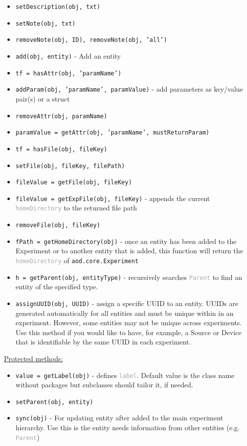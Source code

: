 \documentclass[10pt]{exam}
\newcommand\aodclass[1]{\textcolor{codeblue}{\texttt{#1}}}
\newcommand\aodprop[1]{\textcolor{darkgray}{\texttt{#1}}}
\newcommand\aodfcn[1]{\textcolor{darkteal}{\texttt{#1}}}
\newcommand\docheader[1]{\vspace{0.6ex}\noindent\underline{#1}\vspace{0.15ex}}
\begin{document}
		\begin{itemize}
			\item \aodfcn{setDescription(obj, txt)}
			\item \aodfcn{setNote(obj, txt)}
			\item \aodfcn{removeNote(obj, ID), \aodfcn{removeNote(obj, 'all')}}\\
			\item \aodfcn{add(obj, entity)} - Add an entity\\
			\item \aodfcn{tf = hasAttr(obj, 'paramName')}
			\item \aodfcn{addParam(obj, 'paramName', paramValue)} - add parameters as key/value pair(s) or a struct
			\item \aodfcn{removeAttr(obj, paramName)}
			\item \aodfcn{paramValue = getAttr(obj, 'paramName', mustReturnParam)}\\
			\item \aodfcn{tf = hasFile(obj, fileKey)}
			\item \aodfcn{setFile(obj, fileKey, filePath)}
			\item \aodfcn{fileValue = getFile(obj, fileKey)}
			\item \aodfcn{fileValue = getExpFile(obj, fileKey)} - appends the current \aodprop{homeDirectory} to the returned file path
			\item \aodfcn{removeFile(obj, fileKey)}\\
			\item \aodfcn{fPath = getHomeDirectory(obj)} - once an entity has been added to the Experiment or to another entity that is added, this function will return the \aodprop{homeDirectory} of \aodclass{aod.core.Experiment}
			\item \aodfcn{h = getParent(obj, entityType)} - recursively searches \aodprop{Parent} to find an entity of the specified type. %
			\item \aodfcn{assignUUID(obj, UUID)} - assign a specific UUID to an entity. UUIDs are generated automatically for all entities and must be unique within in an experiment. However, some entities may not be unique across experiments. Use this method if you would like to have, for example, a Source or Device that is identifiable by the same UUID in each experiment. 
		\end{itemize}
		\docheader{Protected methods:}
		\begin{itemize}
			\item \aodfcn{value = getLabel(obj)} - defines \aodprop{label}. Default value is the class name without packages but subclasses should tailor it, if needed.
			\item \aodfcn{setParent(obj, entity)}
			\item \aodfcn{sync(obj)} - For updating entity after added to the main experiment hierarchy. Use this is the entity needs information from other entities (e.g. \aodprop{Parent})
		\end{itemize}
			
\end{document}
